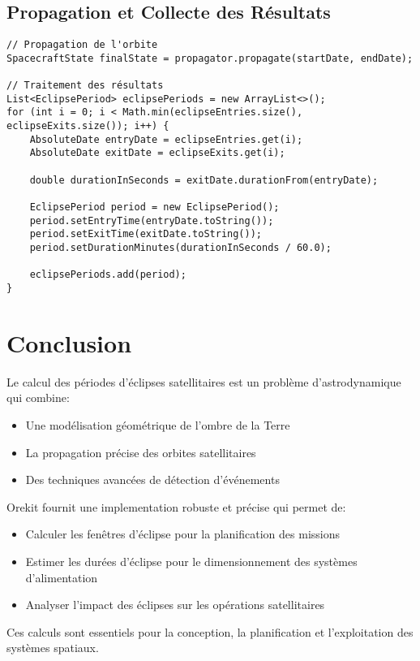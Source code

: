 \documentclass[12pt,a4paper]{article}
\begin{document}
\subsection{Propagation et Collecte des Résultats}

\begin{verbatim}
// Propagation de l'orbite
SpacecraftState finalState = propagator.propagate(startDate, endDate);

// Traitement des résultats
List<EclipsePeriod> eclipsePeriods = new ArrayList<>();
for (int i = 0; i < Math.min(eclipseEntries.size(), eclipseExits.size()); i++) {
    AbsoluteDate entryDate = eclipseEntries.get(i);
    AbsoluteDate exitDate = eclipseExits.get(i);
    
    double durationInSeconds = exitDate.durationFrom(entryDate);
    
    EclipsePeriod period = new EclipsePeriod();
    period.setEntryTime(entryDate.toString());
    period.setExitTime(exitDate.toString());
    period.setDurationMinutes(durationInSeconds / 60.0);
    
    eclipsePeriods.add(period);
}
\end{verbatim}

\section{Conclusion}

Le calcul des périodes d'éclipses satellitaires est un problème d'astrodynamique qui combine:

\begin{itemize}
    \item Une modélisation géométrique de l'ombre de la Terre
    \item La propagation précise des orbites satellitaires
    \item Des techniques avancées de détection d'événements
\end{itemize}

Orekit fournit une implementation robuste et précise qui permet de:
\begin{itemize}
    \item Calculer les fenêtres d'éclipse pour la planification des missions
    \item Estimer les durées d'éclipse pour le dimensionnement des systèmes d'alimentation
    \item Analyser l'impact des éclipses sur les opérations satellitaires
\end{itemize}

Ces calculs sont essentiels pour la conception, la planification et l'exploitation des systèmes spatiaux.
\end{document}
